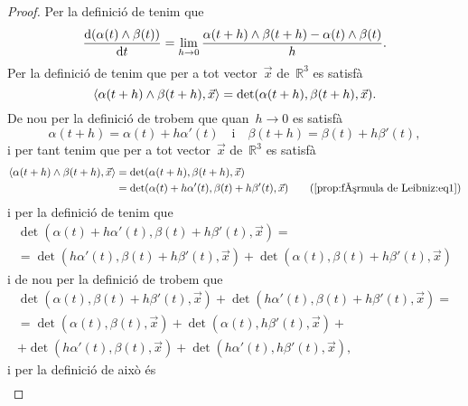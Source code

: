 \documentclass[../../main.tex]{subfiles}
\begin{document}
    \begin{proof}
        Per la definició de  tenim que
        \begin{equation}
            \label{prop:fórmula de Leibniz:eq2}
            \frac{\mathop{}\!\mathrm{d}(\alpha(t)\mathbin{\wedge}\beta(t))}{\mathop{}\!\mathrm{d} t}=\lim_{h\to0}\frac{\alpha(t+h)\mathbin{\wedge}\beta(t+h)-\alpha(t)\mathbin{\wedge}\beta(t)}{h}.
        \end{equation}
        Per la definició de  tenim que per a tot vector~\(\vec{x}\) de~\(\mathbb{R}^{3}\) es satisfà
        \[
            \prodesc{\alpha(t+h)\prodvec\beta(t+h)}{\vec{x}}=\det(\alpha(t+h),\beta(t+h),\vec{x}).
        \]
        De nou per la definició de  trobem que quan~\(h\to0\) es satisfà
        \begin{equation}
            \label{prop:fórmula de Leibniz:eq1}
            \alpha(t+h)=\alpha(t)+h\alpha'(t)\quad\text{i}\quad\beta(t+h)=\beta(t)+h\beta'(t),
        \end{equation}
        i per tant tenim que per a tot vector~\(\vec{x}\) de~\(\mathbb{R}^{3}\) es satisfà
        \begin{align*}
            \prodesc{\alpha(t+h)\prodvec\beta(t+h)}{\vec{x}}&=\det(\alpha(t+h),\beta(t+h),\vec{x}) \\
            &=\det(\alpha(t)+h\alpha'(t),\beta(t)+h\beta'(t),\vec{x}) \tag{\ref{prop:fórmula de Leibniz:eq1}}
        \end{align*}
        i per la definició de  tenim que
        \begin{multline*}
            \det(\alpha(t)+h\alpha'(t),\beta(t)+h\beta'(t),\vec{x})=\\
            =\det(h\alpha'(t),\beta(t)+h\beta'(t),\vec{x})+\det(\alpha(t),\beta(t)+h\beta'(t),\vec{x})
        \end{multline*}
        i de nou per la definició de  trobem que
        \begin{multline*}
            \det(\alpha(t),\beta(t)+h\beta'(t),\vec{x})+\det(h\alpha'(t),\beta(t)+h\beta'(t),\vec{x})=\\
            =\det(\alpha(t),\beta(t),\vec{x})+\det(\alpha(t),h\beta'(t),\vec{x})+\\
            +\det(h\alpha'(t),\beta(t),\vec{x})+\det(h\alpha'(t),h\beta'(t),\vec{x}),
        \end{multline*}
        i per la definició de  això és
        \begin{multline*}

\end{multline*}
\end{proof}
\end{document}
